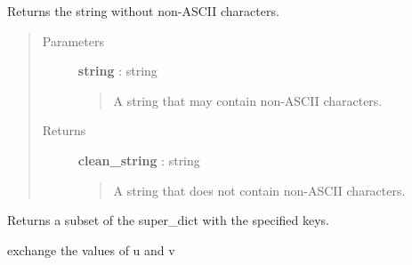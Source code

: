 \documentclass[letterpaper,10pt,english]{sphinxmanual}
\begin{document}
\begin{fulllineitems}
\label{tethne.utilities:tethne.utilities.strip_non_ascii}
Returns the string without non-ASCII characters.
\begin{quote}\begin{description}
\item[{Parameters}] \leavevmode
\textbf{string} : string
\begin{quote}

A string that may contain non-ASCII characters.
\end{quote}

\item[{Returns}] \leavevmode
\textbf{clean\_string} : string
\begin{quote}

A string that does not contain non-ASCII characters.
\end{quote}

\end{description}\end{quote}

\end{fulllineitems}


\begin{fulllineitems}
\label{tethne.utilities:tethne.utilities.strip_punctuation}
\end{fulllineitems}


\begin{fulllineitems}
\label{tethne.utilities:tethne.utilities.subdict}
Returns a subset of the super\_dict with the specified keys.

\end{fulllineitems}


\begin{fulllineitems}
\label{tethne.utilities:tethne.utilities.swap}
exchange the values of u and v

\end{fulllineitems}
\end{document}
